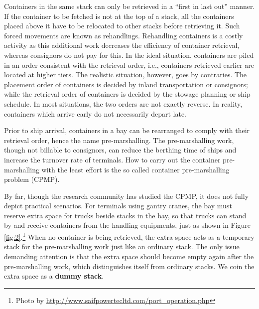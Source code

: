 \documentclass[review,3p,times,authoryear,12pt]{elsarticle}
\begin{document}
Containers in the same stack can only be retrieved in a ``first in last out'' manner. If the container to be fetched is not at the top of a stack, all the containers placed above it have to be relocated to other stacks before retrieving it. Such forced movements are known as rehandlings. Rehandling containers is a costly activity as this additional work decreases the efficiency of container retrieval, whereas consignors do not pay for this. In the ideal situation, containers are piled in an order consistent with the retrieval order, i.e., containers retrieved earlier are located at higher tiers. The realistic situation, however, goes by contraries. The placement order of containers is decided by inland transportation or consignors; while the retrieval order of containers is decided by the stowage planning or ship schedule. In most situations, the two orders are not exactly reverse. In reality, containers which arrive early do not necessarily depart late.

Prior to ship arrival, containers in a bay can be rearranged to comply with their retrieval order, hence the name pre-marshalling. The pre-marshalling work, though not billable to consignors, can reduce the berthing time of ships and increase the turnover rate of terminals. How to carry out the container pre-marshalling with the least effort is the so called container pre-marshalling problem (CPMP). 



By far, though the research community has studied the CPMP, it does not fully depict practical scenarios. For terminals using gantry cranes, the bay must reserve extra space for trucks beside stacks in the bay, so that trucks can stand by and receive containers from the handling equipments, just as shown in Figure \ref{fig:2}.\footnote{Photo by \url{http://www.saifpowertecltd.com/port_operation.php}} When no container is being retrieved, the extra space acts as a temporary stack for the pre-marshalling work just like an ordinary stack. The only issue demanding attention is that the extra space should become empty again after the pre-marshalling work, which distinguishes itself from ordinary stacks. We coin the extra space as a \textbf{dummy stack}.
\end{document}
